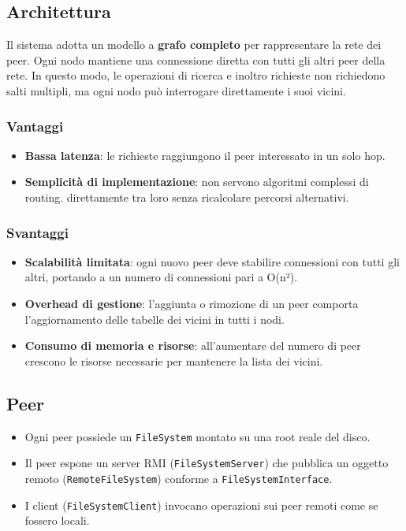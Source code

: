 \documentclass[11pt]{article}
\begin{document}
\subsection{Architettura}
\label{sec:orgfc6f65a}
Il sistema adotta un modello a \textbf{\textbf{grafo completo}} per rappresentare la rete dei peer.
Ogni nodo mantiene una connessione diretta con tutti gli altri peer della rete.
In questo modo, le operazioni di ricerca e inoltro richieste non richiedono salti multipli,
ma ogni nodo può interrogare direttamente i suoi vicini.
\subsubsection{Vantaggi}
\label{sec:org769eec9}
\begin{itemize}
\item \textbf{Bassa latenza}: le richieste raggiungono il peer interessato in un solo hop.
\item \textbf{Semplicità di implementazione}: non servono algoritmi complessi di routing.
direttamente tra loro senza ricalcolare percorsi alternativi.
\end{itemize}
\subsubsection{Svantaggi}
\label{sec:org5370f4a}
\begin{itemize}
\item \textbf{Scalabilità limitata}: ogni nuovo peer deve stabilire connessioni con tutti gli altri,
portando a un numero di connessioni pari a O(n²).
\item \textbf{Overhead di gestione}: l’aggiunta o rimozione di un peer comporta l’aggiornamento delle
tabelle dei vicini in tutti i nodi.
\item \textbf{Consumo di memoria e risorse}: all’aumentare del numero di peer crescono le risorse
necessarie per mantenere la lista dei vicini.
\end{itemize}
\subsection{Peer}
\label{sec:orgbcbf4e2}
\begin{itemize}
\item Ogni peer possiede un \texttt{FileSystem} montato su una root reale del disco.
\item Il peer espone un server RMI (\texttt{FileSystemServer}) che pubblica un oggetto
remoto (\texttt{RemoteFileSystem}) conforme a \texttt{FileSystemInterface}.
\item I client (\texttt{FileSystemClient}) invocano operazioni sui peer remoti come se
fossero locali.
\end{itemize}
\end{document}
